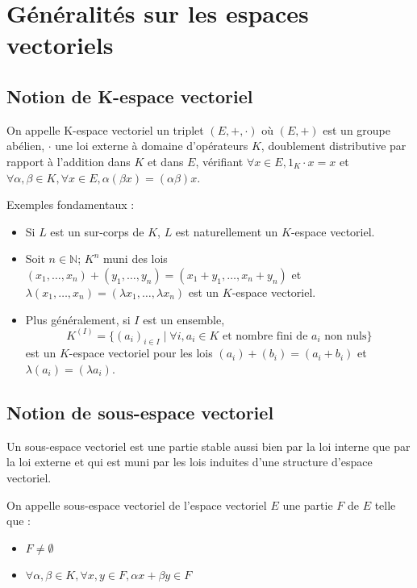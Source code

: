 \section{Généralités sur les espaces vectoriels}

\subsection{Notion de K-espace vectoriel}

\begin{de}
On appelle K-espace vectoriel un triplet $(E,+,\cdot)$ où $(E,+)$ est un groupe abélien, $\cdot$ une loi externe à domaine d'opérateurs $K$, doublement distributive par rapport à l'addition dans $K$ et dans $E$, vérifiant $\forall x \in E, 1_K\cdot x = x$ et $\forall \alpha,\beta \in K, \forall x \in E, \alpha (\beta x) = (\alpha \beta) x$.
\end{de}

\begin{rem}
Exemples fondamentaux : 
\begin{itemize}
\item Si $L$ est un sur-corps de $K$, $L$ est naturellement un $K$-espace vectoriel.
\item Soit $n \in \mathbb{N}$; $K^n$ muni des lois $(x_1,\ldots,x_n) + (y_1,\ldots,y_n) = (x_1 + y_1,\ldots,x_n + y_n)$ et $\lambda(x_1,\ldots,x_n) = (\lambda x_1,\ldots,\lambda x_n)$ est un $K$-espace vectoriel.
\item Plus généralement, si $I$ est un ensemble,
\[ K^{(I)} = \{(a_i)_{i\in I} \mid \forall i, a_i \in K \text{ et nombre fini de } a_i \text{ non nuls}\} \]
est un $K$-espace vectoriel pour les lois $(a_i) + (b_i) = (a_i + b_i)$ et $\lambda(a_i) = (\lambda a_i)$.
\end{itemize}
\end{rem}

\subsection{Notion de sous-espace vectoriel}

\begin{rem}
Un sous-espace vectoriel est une partie stable aussi bien par la loi interne que par la loi externe et qui est muni par les lois induites d'une structure d'espace vectoriel.
\end{rem}

\begin{de}
On appelle sous-espace vectoriel de l'espace vectoriel $E$ une partie $F$ de $E$ telle que :
\begin{itemize}
\item $F \neq \emptyset$
\item $\forall \alpha,\beta \in K, \forall x,y \in F, \alpha x + \beta y \in F$
\end{itemize}
\end{de}


